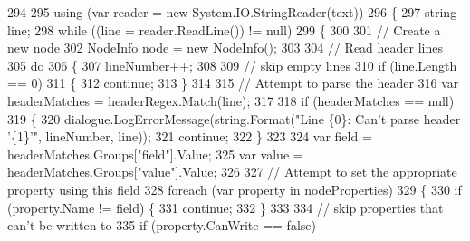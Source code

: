 \begin{DoxyCode}
294 
295                     \textcolor{keyword}{using} (var reader = \textcolor{keyword}{new} System.IO.StringReader(text))
296                     \{
297                         \textcolor{keywordtype}{string} line;
298                         \textcolor{keywordflow}{while} ((line = reader.ReadLine()) != null)
299                         \{
300                             
301                             \textcolor{comment}{// Create a new node}
302                             NodeInfo node = \textcolor{keyword}{new} NodeInfo();
303 
304                             \textcolor{comment}{// Read header lines}
305                             \textcolor{keywordflow}{do}
306                             \{
307                                 lineNumber++;
308 
309                                 \textcolor{comment}{// skip empty lines}
310                                 \textcolor{keywordflow}{if} (line.Length == 0)
311                                 \{
312                                     \textcolor{keywordflow}{continue};
313                                 \}
314 
315                                 \textcolor{comment}{// Attempt to parse the header}
316                                 var headerMatches = headerRegex.Match(line);
317 
318                                 \textcolor{keywordflow}{if} (headerMatches == null)
319                                 \{
320                                     dialogue.LogErrorMessage(string.Format(\textcolor{stringliteral}{"Line \{0\}: Can't parse header
       '\{1\}'"}, lineNumber, line));
321                                     \textcolor{keywordflow}{continue};
322                                 \}
323 
324                                 var field = headerMatches.Groups[\textcolor{stringliteral}{"field"}].Value;
325                                 var value = headerMatches.Groups[\textcolor{stringliteral}{"value"}].Value;
326 
327                                 \textcolor{comment}{// Attempt to set the appropriate property using this field}
328                                 \textcolor{keywordflow}{foreach} (var property \textcolor{keywordflow}{in} nodeProperties)
329                                 \{
330                                     \textcolor{keywordflow}{if} (property.Name != field) \{
331                                         \textcolor{keywordflow}{continue};
332                                     \}
333 
334                                     \textcolor{comment}{// skip properties that can't be written to}
335                                     \textcolor{keywordflow}{if} (property.CanWrite == \textcolor{keyword}{false})

\end{DoxyCode}
